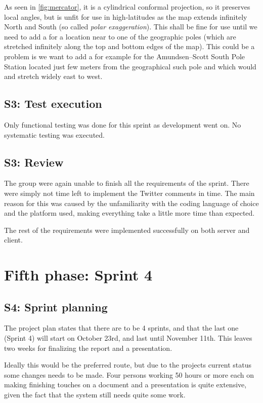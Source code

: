 \documentclass[11pt]{book}
\begin{document}
As seen in \ref{fig:mercator}, it is a cylindrical conformal projection, so it preserves local angles, but is unfit for use in high-latitudes as the map extends infinitely North and South (so called \emph{polar exaggeration}). This shall be fine for use until we need to add a \wallentitys for a location near to one of the geographic poles (which are stretched infinitely along the top and bottom edges of the map). This could be a problem is we want to add a \wallentitys for example for the Amundsen–Scott South Pole Station located just few meters from the geographical such pole and which would and stretch widely east to west. \cite{progonos:mercator,radicalcartography} 


\subsection{S3: Test execution}
Only functional testing was done for this sprint as development went on. No systematic testing was executed.

\subsection{S3: Review}
The group were again unable to finish all the requirements of the sprint. There were simply not time left to implement the Twitter comments in time. The main reason for this was caused by the unfamiliarity with the coding language of choice and the platform used, making everything take a little more time than expected.

The rest of the requirements were implemented successfully on both server and client.

\section{Fifth phase: Sprint 4}

\subsection{S4: Sprint planning}
The project plan states that there are to be 4 sprints, and that the last one (Sprint 4) will start on October 23rd, and last until November 11th. This leaves two weeks for finalizing the report and a presentation.

Ideally this would be the preferred route, but due to the projects current status some changes needs to be made. Four persons working 50 hours or more each on making finishing touches on a document and a presentation is quite extensive, given the fact that the system still needs quite some work.
\end{document}
